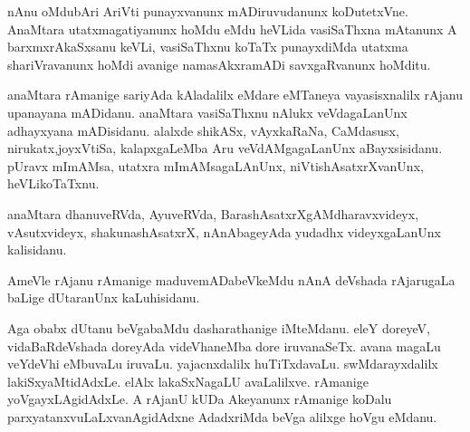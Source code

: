 \documentclass{article}
\begin{document}
\begin{mn}
nAnu  oMdubAri  AriVti  punayxvanunx  mADiruvudanunx  koDutetxVne.  AnaMtara  utatxmagatiyanunx  hoMdu  
eMdu  heVLida  vasiSaThxna  mAtanunx  A  barxmxrAkaSxsanu  keVLi,  vasiSaThxnu  koTaTx  punayxdiMda  
utatxma  shariVravanunx  hoMdi  avanige  namasAkxramADi  savxgaRvanunx  hoMditu.
\end{mn}

\begin{mn}
anaMtara  rAmanige  sariyAda  kAladalilx  eMdare  eMTaneya  vayasisxnalilx  rAjanu  upanayana mADidanu.  
anaMtara  vasiSaThxnu  nAlukx  veVdagaLanUnx  adhayxyana  mADisidanu.  alalxde  shikASx,  vAyxkaRaNa,  
CaMdasusx, nirukatx,joyxVtiSa,  kalapxgaLeMba  Aru  veVdAMgagaLanUnx  aBayxsisidanu.  pUravx  mImAMsa,  
utatxra mImAMsagaLAnUnx,  niVtishAsatxrXvanUnx,  heVLikoTaTxnu.
\end{mn}

\begin{mn}
anaMtara  dhanuveRVda,  AyuveRVda,  BarashAsatxrXgAMdharavxvideyx,  vAsutxvideyx,  shakunashAsatxrX,  
nAnAbageyAda  yudadhx  videyxgaLanUnx  kalisidanu.
\end{mn}

\begin{mn}
AmeVle  rAjanu  rAmanige  maduvemADabeVkeMdu  nAnA  deVshada  rAjarugaLa  baLige  dUtaranUnx  kaLuhisidanu.
\end{mn}

\begin{mn}
Aga  obabx  dUtanu  beVgabaMdu  dasharathanige  iMteMdanu.  eleY  doreyeV,  vidaBaRdeVshada  doreyAda  
videVhaneMba  dore  iruvanaSeTx.  avana  magaLu  veYdeVhi  eMbuvaLu  iruvaLu.  yajacnxdalilx  huTiTxdavaLu.  
swMdarayxdalilx  lakiSxyaMtidAdxLe.  elAlx  lakaSxNagaLU  avaLalilxve.  rAmanige  yoVgayxLAgidAdxLe.  A  rAjanU  
kUDa  Akeyanunx  rAmanige  koDalu  parxyatanxvuLaLxvanAgidAdxne  AdadxriMda  beVga  alilxge  hoVgu  eMdanu.
\end{mn}
\end{document}
